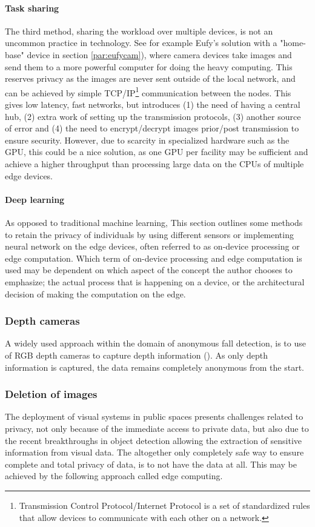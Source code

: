 \paragraph{Task sharing}
The third method, sharing the workload over multiple devices, is not an uncommon practice in technology. See for example Eufy's solution with a "home-base" device in section \ref{par:eufycam}), where camera devices take images and send them to a more powerful computer for doing the heavy computing. This reserves privacy as the images are never sent outside of the local network, and can be achieved by simple TCP/IP\footnote{Transmission Control Protocol/Internet Protocol is a set of standardized rules that allow devices to communicate with each other on a network.} communication between the nodes. This gives low latency, fast networks, but introduces (1) the need of having a central hub, (2) extra work of setting up the transmission protocols, (3) another source of error and (4) the need to encrypt/decrypt images prior/post transmission to ensure security. However, due to scarcity in specialized hardware such as the GPU, this could be a nice solution, as one GPU per facility may be sufficient and achieve a higher throughput than processing large data on the CPUs of multiple edge devices.

\paragraph{Deep learning}
As opposed to traditional machine learning,
This section outlines some methods to retain the privacy of individuals by using different sensors or implementing neural network on the edge devices, often referred to as on-device processing or edge computation. Which term of on-device processing and edge computation is used may be dependent on which aspect of the concept the author chooses to emphasize; the actual process that is happening on a device, or the architectural decision of making the computation on the edge.

\subsubsection{Depth cameras}
A widely used approach within the domain of anonymous fall detection, is to use of RGB depth cameras to capture depth information (\cite{wa2020elderly_fall_detection_meta}). As only depth information is captured, the data remains completely anonymous from the start.

\subsubsection{Deletion of images}
The deployment of visual systems in public spaces presents challenges related to privacy, not only because of the immediate access to private data, but also due to the recent breakthroughs in object detection allowing the extraction of sensitive information from visual data. The altogether only completely safe way to ensure complete and total privacy of data, is to not have the data at all. This may be achieved by the following approach called edge computing.

